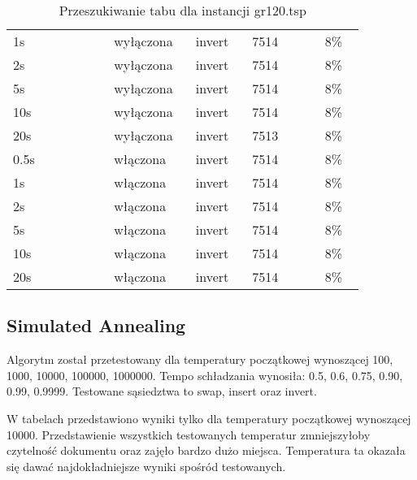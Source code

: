 \documentclass[12pt,a4paper,titlepage]{article}
\begin{document}
\begin{table}[H]
{\begin{tabular}{|p{0.25\linewidth}p{0.19\linewidth}p{0.14\linewidth}p{0.18\linewidth}p{0.1\linewidth}|}
        1s & wyłączona & invert & 7514 & 8\% \\
        2s & wyłączona & invert & 7514 & 8\% \\
        5s & wyłączona & invert & 7514 & 8\% \\
        10s & wyłączona & invert & 7514 & 8\% \\
        20s & wyłączona & invert & 7513 & 8\% \\
        \hline
        0.5s & włączona & invert & 7514 & 8\% \\
        1s & włączona & invert & 7514 & 8\% \\
        2s & włączona & invert & 7514 & 8\% \\
        5s & włączona & invert & 7514 & 8\% \\
        10s & włączona & invert & 7514 & 8\% \\
        20s & włączona & invert & 7514 & 8\% \\
        \hline
	\end{tabular}}
	\caption{Przeszukiwanie tabu dla instancji gr120.tsp}
\end{table}

\subsection{Simulated Annealing}
Algorytm został przetestowany dla temperatury początkowej wynoszącej 100, 1000, 10000, 100000, 1000000. Tempo schładzania wynosiła: 0.5, 0.6, 0.75, 0.90, 0.99, 0.9999. Testowane sąsiedztwa to swap, insert oraz invert.

W tabelach przedstawiono wyniki tylko dla temperatury początkowej wynoszącej 10000. Przedstawienie wszystkich testowanych temperatur zmniejszyłoby czytelność dokumentu oraz zajęło bardzo dużo miejsca. Temperatura ta okazała się dawać najdokładniejsze wyniki spośród testowanych.
\end{document}
